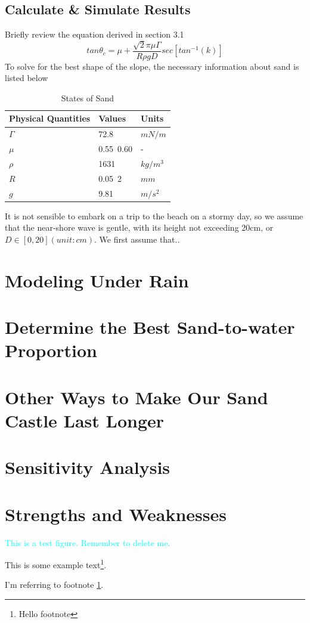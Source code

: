 \documentclass[12pt]{article}
\begin{document}
\subsection{Calculate \& Simulate Results}
Briefly review the equation derived in section 3.1
$$tan\theta_c = \mu + \frac{\sqrt{2}\pi\mu\Gamma}{R\rho gD}sec[tan^{-1}(k)]$$
To solve for the best shape of the slope, the necessary information about sand is listed below
\begin{table}[H]
	\caption{States of Sand}
	\vspace{10pt}
	\centering
	\begin{tabular}{p{4cm}p{2cm}p{2cm}}
		\hline
		Physical Quantities & Values & Units 	\\
		\hline
		$\Gamma$		  & 72.8   	    & $mN/m$              \\
		$\mu$  			  & 0.55~0.60   & -     	            \\
		$\rho$ 			  & 1631     &  $kg/m^3$          \\
		$R$ 			  & 0.05~2   & $mm$               \\
		$g$  			  & 9.81      & $m/s^2$     \\
		\hline
	\end{tabular}
	\label{bs2}
\end{table}
\par
It is not sensible to embark on a trip to the beach on a stormy day, so we assume that the near-shore wave is gentle, with its height not exceeding 20cm, or $D \in [0, 20](unit:cm)$.
We first assume that..

\section{Modeling Under Rain}

\section{Determine the Best Sand-to-water Proportion}
\section{Other Ways to Make Our Sand Castle Last Longer}

\section{Sensitivity Analysis}
\section{Strengths and Weaknesses}

\textcolor{cyan}{This is a test figure. Remember to delete me.}



This is some example text\footnote{\label{myfootnote}Hello footnote}.

I'm referring to footnote \ref{myfootnote}.


\newpage
\begin{appendix}
    \listoffigures
    \listoftables
    \listoflistings
    \printbibliography
\end{appendix}
\end{document}
